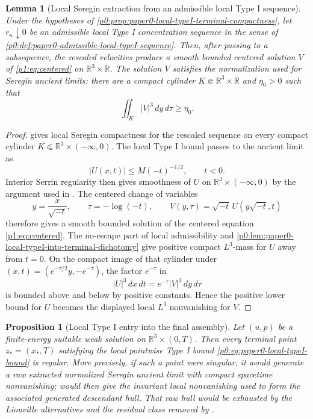 \documentclass[11pt]{amsart}
\theoremstyle{plain}
\newtheorem{lemma}[lemma]{Lemma}
\newtheorem{proposition}[proposition]{Proposition}
\theoremstyle{definition}
\theoremstyle{remark}
\numberwithin{equation}{section}
\begin{document}
\begin{lemma}[Local Seregin extraction from an admissible local Type I sequence]
\label{p0:lem:local-seregin-extraction}
Under the hypotheses of
\cref{p0:prop:paper0-local-typeI-terminal-compactness}, let \(r_n\downarrow0\)
be an admissible local Type I concentration sequence in the sense of
\cref{p0:def:paper0-admissible-local-typeI-sequence}.  Then, after passing to
a subsequence, the rescaled velocities produce a smooth bounded centered
solution \(V\) of \eqref{p1:eq:centered} on
\(\mathbb R^3\times\mathbb R\).  The solution \(V\) satisfies the
normalization used for Seregin ancient limits: there are a compact cylinder
\(K\Subset\mathbb R^3\times\mathbb R\) and \(\eta_0>0\) such that
\[
   \iint_K |V|^3\,dy\,d\tau\ge\eta_0 .
\]
\end{lemma}

\begin{proof}
 gives local Seregin
compactness for the rescaled sequence on every compact cylinder
\(K\Subset\mathbb R^3\times(-\infty,0)\).  The local Type I bound passes to
the ancient limit as
\[
   |U(x,t)|\le M(-t)^{-1/2},\qquad t<0.
\]
Interior Serrin regularity then gives smoothness of \(U\) on
\(\mathbb R^3\times(-\infty,0)\) by the argument used in
.  The centered change of variables
\[
   y=\frac{x}{\sqrt{-t}},\qquad \tau=-\log(-t),\qquad
   V(y,\tau)=\sqrt{-t}\,U(y\sqrt{-t},t)
\]
therefore gives a smooth bounded solution of the centered equation
\eqref{p1:eq:centered}.  The no-escape part of local admissibility and
\cref{p0:lem:paper0-local-typeI-into-terminal-dichotomy} give positive
compact \(L^3\)-mass for \(U\) away from \(t=0\).  On the compact image of
that cylinder under \((x,t)=(e^{-\tau/2}y,-e^{-\tau})\), the factor
\(e^{-\tau}\) in
\[
   |U|^3\,dx\,dt=e^{-\tau}|V|^3\,dy\,d\tau
\]
is bounded above and below by positive constants.  Hence the positive lower
bound for \(U\) becomes the displayed local \(L^3\) nonvanishing for \(V\).
\end{proof}

\begin{proposition}[Local Type I entry into the final assembly]
\label{p0:prop:local-typeI-entry-final-assembly}
Let \((u,p)\) be a finite-energy suitable weak solution on
\(\mathbb R^3\times(0,T)\).  Then every terminal point \(z_*=(x_*,T)\) satisfying
the local pointwise Type I bound \eqref{p0:eq:paper0-local-typeI-bound}
is regular.  More precisely, if such a point were singular, it would generate
a raw extracted normalized Seregin ancient limit with compact spacetime
nonvanishing;  would then give the
invariant local nonvanishing used to form the associated generated descendant
hull.  That raw hull would be exhausted by the Liouville alternatives and the
residual class removed by .
\end{proposition}
\end{document}
